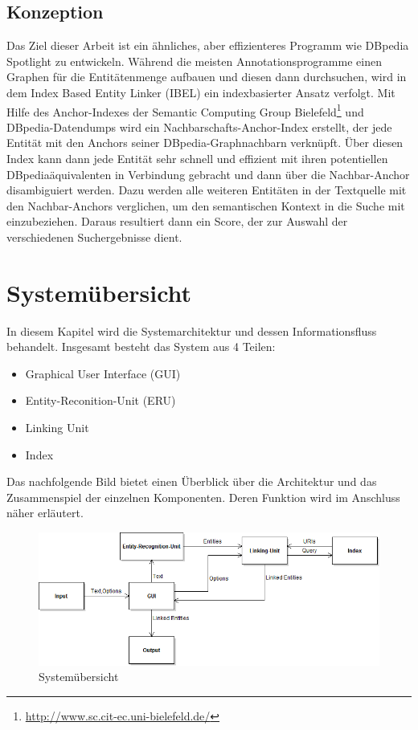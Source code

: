 \documentclass[11pt, a4paper, oneside]{Thesis} %
\begin{document}
\section{Konzeption}
Das Ziel dieser Arbeit ist ein \"ahnliches, aber effizienteres Programm wie DBpedia Spotlight zu entwickeln. W\"ahrend die meisten Annotationsprogramme einen Graphen f\"ur die Entit\"atenmenge aufbauen und diesen dann durchsuchen, wird in dem Index Based Entity Linker (IBEL) ein indexbasierter Ansatz verfolgt. Mit Hilfe des Anchor-Indexes der Semantic Computing Group Bielefeld\footnote{\url{http://www.sc.cit-ec.uni-bielefeld.de/}} und DBpedia-Datendumps wird ein Nachbarschafts-Anchor-Index erstellt, der jede Entit\"at mit den Anchors seiner DBpedia-Graphnachbarn verkn\"upft. \"Uber diesen Index kann dann jede Entit\"at sehr schnell und effizient mit ihren potentiellen DBpedia\"aquivalenten in Verbindung gebracht und dann \"uber die Nachbar-Anchor disambiguiert werden. Dazu werden alle weiteren Entit\"aten in der Textquelle mit den Nachbar-Anchors verglichen, um den semantischen Kontext in die Suche mit einzubeziehen. Daraus resultiert dann ein Score, der zur Auswahl der verschiedenen Suchergebnisse dient.

\chapter{System\"ubersicht}
\label{Kapitel 2}

In diesem Kapitel wird die Systemarchitektur und dessen Informationsfluss behandelt. Insgesamt besteht das System aus 4 Teilen:
\begin{itemize}
\item Graphical User Interface (GUI)
\item Entity-Reconition-Unit (ERU)
\item Linking Unit
\item Index
\end{itemize}
Das nachfolgende Bild bietet einen \"Uberblick \"uber die Architektur und das Zusammenspiel der einzelnen Komponenten. Deren Funktion wird im Anschluss n\"aher erl\"autert.
\begin{figure}[ht]
\centering
\includegraphics[scale=0.55]{./system.png}
\caption[System\"ubersicht]{System\"ubersicht}
\end{figure}
\end{document}
